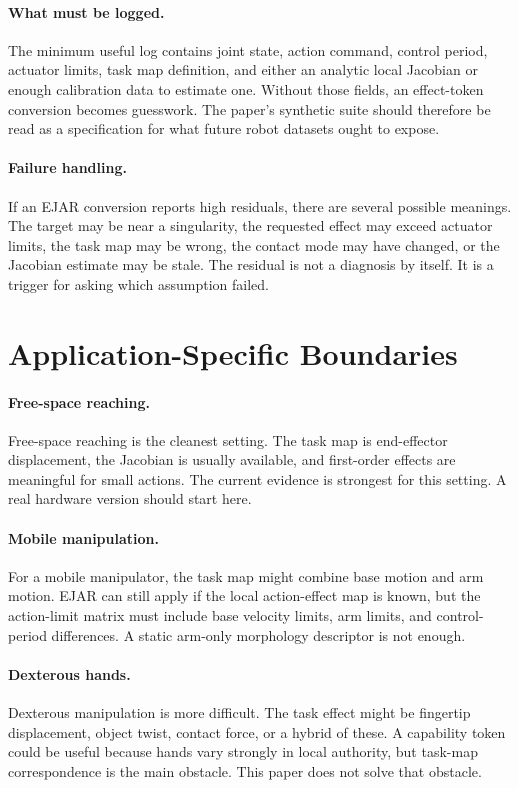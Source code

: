 \documentclass{article}
\begin{document}
\paragraph{What must be logged.}
The minimum useful log contains joint state, action command, control period, actuator limits, task map definition, and either an analytic local Jacobian or enough calibration data to estimate one. Without those fields, an effect-token conversion becomes guesswork. The paper's synthetic suite should therefore be read as a specification for what future robot datasets ought to expose.

\paragraph{Failure handling.}
If an EJAR conversion reports high residuals, there are several possible meanings. The target may be near a singularity, the requested effect may exceed actuator limits, the task map may be wrong, the contact mode may have changed, or the Jacobian estimate may be stale. The residual is not a diagnosis by itself. It is a trigger for asking which assumption failed.

\section{Application-Specific Boundaries}

\paragraph{Free-space reaching.}
Free-space reaching is the cleanest setting. The task map is end-effector displacement, the Jacobian is usually available, and first-order effects are meaningful for small actions. The current evidence is strongest for this setting. A real hardware version should start here.

\paragraph{Mobile manipulation.}
For a mobile manipulator, the task map might combine base motion and arm motion. EJAR can still apply if the local action-effect map is known, but the action-limit matrix must include base velocity limits, arm limits, and control-period differences. A static arm-only morphology descriptor is not enough.

\paragraph{Dexterous hands.}
Dexterous manipulation is more difficult. The task effect might be fingertip displacement, object twist, contact force, or a hybrid of these. A capability token could be useful because hands vary strongly in local authority, but task-map correspondence is the main obstacle. This paper does not solve that obstacle.
\end{document}
